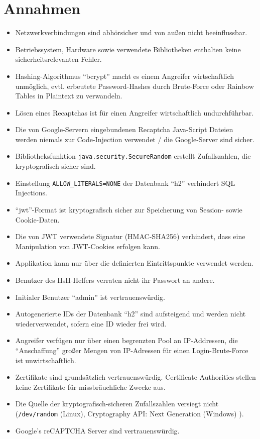 \documentclass[fontsize=12pt,DIV=14,BCOR=10mm,a4paper,parskip=half-,ngerman,english,bibliography=totocnumbered]{scrreprt}
\begin{document}
\vspace*{-3cm}

\clearpage

\tableofcontents  %

\clearpage

\chapter{Annahmen}

\begin{itemize}
  \item Netzwerkverbindungen sind abhörsicher und von außen nicht beeinflussbar.
  \item Betriebssystem, Hardware sowie verwendete Bibliotheken enthalten keine sicherheitsrelevanten Fehler.
  \item Hashing-Algorithmus \enquote{bcrypt} macht es einem Angreifer wirtschaftlich unmöglich, evtl. erbeutete Password-Hashes durch Brute-Force oder Rainbow Tables in Plaintext zu verwandeln.
  \item Lösen eines Recaptchas ist für einen Angreifer wirtschaftlich undurchführbar.
  \item Die von Google-Servern eingebundenen Recaptcha Java-Script Dateien werden niemals zur Code-Injection verwendet / die Google-Server sind sicher.
  \item Bibliotheksfunktion \texttt{java.security.SecureRandom} \autocite{JavaDocs.SecureRandom} erstellt Zufallszahlen, die kryptografisch sicher sind.
  \item Einstellung \texttt{ALLOW\_LITERALS=NONE} der Datenbank \enquote{h2} verhindert SQL Injections.
  \item \enquote{\gls{jwt}}-Format ist kryptografisch sicher zur Speicherung von Session- sowie Cookie-Daten.
  \item Die von JWT verwendete Signatur (HMAC-SHA256) verhindert, dass eine Manipulation von JWT-Cookies erfolgen kann.
  \item Applikation kann nur über die definierten Eintrittspunkte verwendet werden.
  \item Benutzer des HsH-Helfers verraten nicht ihr Passwort an andere.
  \item Initialer Benutzer \enquote{admin} ist vertrauenswürdig.
  \item Autogenerierte IDs der Datenbank \enquote{h2} sind aufsteigend und werden nicht wiederverwendet, sofern eine ID wieder frei wird.
  \item Angreifer verfügen nur über einen begrenzten Pool an IP-Addressen, die \enquote{Anschaffung} großer Mengen von IP-Adressen für einen Login-Brute-Force ist unwirtschaftlich.
  \item Zertifikate sind grundsätzlich vertrauenswürdig. Certificate Authorities stellen keine Zertifikate für missbräuchliche Zwecke aus.
  \item Die Quelle der kryptografisch-sicheren Zufallszahlen versiegt nicht (\texttt{/dev/random} (Linux), Cryptography API: Next Generation (Windows) \autocite{Windows.SecureRandom}).
  \item Google's reCAPTCHA Server sind vertrauenswürdig.
\end{itemize}
\end{document}
